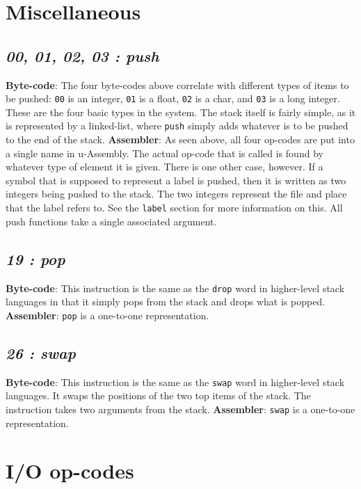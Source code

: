 \documentclass[12pt]{report}
\begin{document}
  \section{Miscellaneous}
  \subsection{\emph{00, 01, 02, 03 : push}}
  \textbf{Byte-code}: The four byte-codes above correlate with different types of
  items to be pushed: \verb|00| is an integer, \verb|01| is a float, \verb|02| is a
  char, and \verb|03| is a long integer.  These are the four basic types in the system.
  The stack itself is fairly simple, as it is represented by a linked-list, where
  \verb|push| simply adds whatever is to be pushed to the end of the stack.\newline
  \textbf{Assembler}: As seen above, all four op-codes are put into a single name in
  u-Assembly.  The actual op-code that is called is found by whatever type of
  element it is given.  There is one other case, however.  If a symbol that is
  supposed to represent a label is pushed, then it is written as two integers being
  pushed to the stack.  The two integers represent the file and place that the
  label refers to.  See the \verb|label| section for more information on this.
  \newline
  All push functions take a single associated argument.
  \subsection{\emph{19 : pop}}
  \textbf{Byte-code}: This instruction is the same as the \verb|drop| word in
  higher-level stack languages in that it simply pops from the stack and drops what
  is popped.\newline
  \textbf{Assembler}: \verb|pop| is a one-to-one representation.
  \subsection{\emph{26 : swap}}
  \textbf{Byte-code}: This instruction is the same as the \verb|swap| word in
  higher-level stack languages.  It swaps the positions of the two top items of
  the stack.  The instruction takes two arguments from the stack.
  \textbf{Assembler}: \verb|swap| is a one-to-one representation.

  \section{I/O op-codes}
\end{document}
